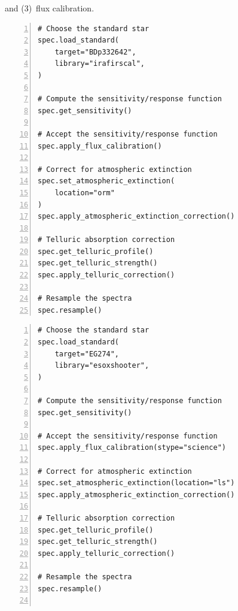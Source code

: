 \documentclass[linenumbers, twocolumn]{aastex631}
\begin{document}
and (3)~flux calibration.

\vspace*{1em}

\noindent
\begin{minipage}{0.475\linewidth}
\begin{Verbatim}[frame=topline,numbers=left,label=LT/SPRAT,framesep=3mm]
# Choose the standard star
spec.load_standard(
    target="BDp332642",
    library="irafirscal",
)

# Compute the sensitivity/response function
spec.get_sensitivity()

# Accept the sensitivity/response function
spec.apply_flux_calibration()

# Correct for atmospheric extinction
spec.set_atmospheric_extinction(
    location="orm"
)
spec.apply_atmospheric_extinction_correction()

# Telluric absorption correction
spec.get_telluric_profile()
spec.get_telluric_strength()
spec.apply_telluric_correction()

# Resample the spectra
spec.resample()
\end{Verbatim}
\end{minipage}\hfill
\begin{minipage}{0.475\linewidth}
\begin{Verbatim}[frame=topline,numbers=left,label=Gemini/GMOS,framesep=3mm]
# Choose the standard star
spec.load_standard(
    target="EG274",
    library="esoxshooter",
)

# Compute the sensitivity/response function
spec.get_sensitivity()

# Accept the sensitivity/response function
spec.apply_flux_calibration(stype="science")

# Correct for atmospheric extinction
spec.set_atmospheric_extinction(location="ls")
spec.apply_atmospheric_extinction_correction()

# Telluric absorption correction
spec.get_telluric_profile()
spec.get_telluric_strength()
spec.apply_telluric_correction()

# Resample the spectra
spec.resample()


\end{Verbatim}
\end{minipage}



{}



\end{document}
